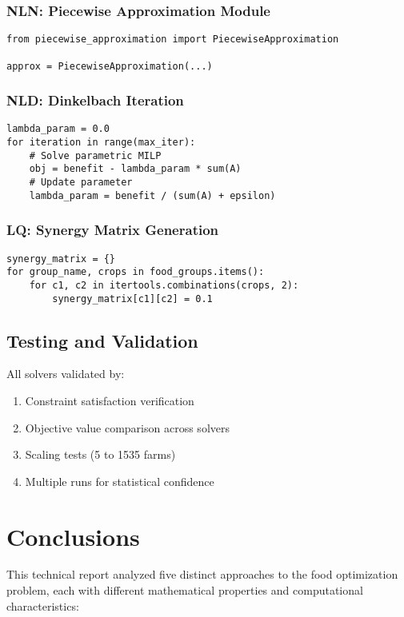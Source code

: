 \documentclass[11pt,a4paper]{article}
\begin{document}
\subsubsection{NLN: Piecewise Approximation Module}
\begin{verbatim}
from piecewise_approximation import PiecewiseApproximation

approx = PiecewiseApproximation(...)
\end{verbatim}

\subsubsection{NLD: Dinkelbach Iteration}
\begin{verbatim}
lambda_param = 0.0
for iteration in range(max_iter):
    # Solve parametric MILP
    obj = benefit - lambda_param * sum(A)
    # Update parameter
    lambda_param = benefit / (sum(A) + epsilon)
\end{verbatim}

\subsubsection{LQ: Synergy Matrix Generation}
\begin{verbatim}
synergy_matrix = {}
for group_name, crops in food_groups.items():
    for c1, c2 in itertools.combinations(crops, 2):
        synergy_matrix[c1][c2] = 0.1
\end{verbatim}

\subsection{Testing and Validation}

All solvers validated by:
\begin{enumerate}
    \item Constraint satisfaction verification
    \item Objective value comparison across solvers
    \item Scaling tests (5 to 1535 farms)
    \item Multiple runs for statistical confidence
\end{enumerate}

\section{Conclusions}

This technical report analyzed five distinct approaches to the food optimization problem, each with different mathematical properties and computational characteristics:
\end{document}
